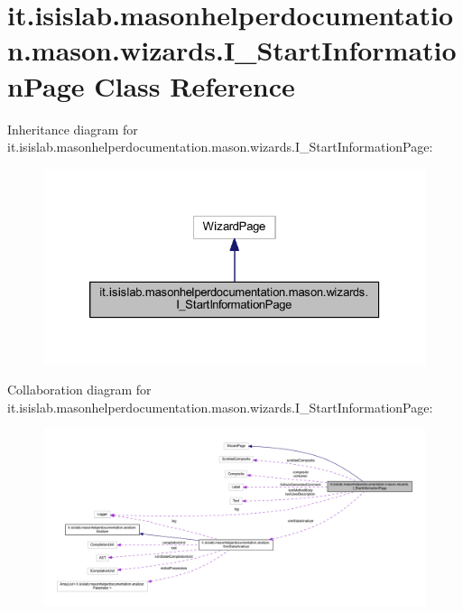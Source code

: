 \hypertarget{classit_1_1isislab_1_1masonhelperdocumentation_1_1mason_1_1wizards_1_1_i___start_information_page}{\section{it.\-isislab.\-masonhelperdocumentation.\-mason.\-wizards.\-I\-\_\-\-Start\-Information\-Page Class Reference}
\label{classit_1_1isislab_1_1masonhelperdocumentation_1_1mason_1_1wizards_1_1_i___start_information_page}
}


Inheritance diagram for it.\-isislab.\-masonhelperdocumentation.\-mason.\-wizards.\-I\-\_\-\-Start\-Information\-Page\-:\nopagebreak
\begin{figure}[H]
\begin{center}
\leavevmode
\includegraphics[width=326pt]{classit_1_1isislab_1_1masonhelperdocumentation_1_1mason_1_1wizards_1_1_i___start_information_page__inherit__graph}
\end{center}
\end{figure}


Collaboration diagram for it.\-isislab.\-masonhelperdocumentation.\-mason.\-wizards.\-I\-\_\-\-Start\-Information\-Page\-:\nopagebreak
\begin{figure}[H]
\begin{center}
\leavevmode
\includegraphics[width=350pt]{classit_1_1isislab_1_1masonhelperdocumentation_1_1mason_1_1wizards_1_1_i___start_information_page__coll__graph}
\end{center}
\end{figure}
